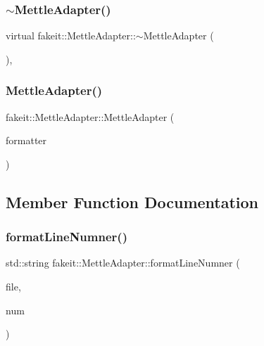 \subsubsection{\texorpdfstring{$\sim$MettleAdapter()}{~MettleAdapter()}\hspace{0.1cm}{\footnotesize\ttfamily [2/2]}}
{\footnotesize\ttfamily virtual fakeit\+::\+Mettle\+Adapter\+::$\sim$\+Mettle\+Adapter (\begin{DoxyParamCaption}{ }\end{DoxyParamCaption})\hspace{0.3cm}{\ttfamily [virtual]}, {\ttfamily [default]}}

\mbox{\label{structfakeit_1_1MettleAdapter_a0d89a32cd8b88da3f8abacc54c0414a2}} 
\subsubsection{\texorpdfstring{MettleAdapter()}{MettleAdapter()}\hspace{0.1cm}{\footnotesize\ttfamily [2/2]}}
{\footnotesize\ttfamily fakeit\+::\+Mettle\+Adapter\+::\+Mettle\+Adapter (\begin{DoxyParamCaption}\item[{\mbox{\hyperlink{structfakeit_1_1EventFormatter}{Event\+Formatter}} \&}]{formatter }\end{DoxyParamCaption})\hspace{0.3cm}{\ttfamily [inline]}}



\subsection{Member Function Documentation}
\mbox{\label{structfakeit_1_1MettleAdapter_abd44747bce7bbc8aaa94fe8a742bf5c6}} 
\subsubsection{\texorpdfstring{formatLineNumner()}{formatLineNumner()}\hspace{0.1cm}{\footnotesize\ttfamily [1/2]}}
{\footnotesize\ttfamily std\+::string fakeit\+::\+Mettle\+Adapter\+::format\+Line\+Numner (\begin{DoxyParamCaption}\item[{std\+::string}]{file,  }\item[{int}]{num }\end{DoxyParamCaption})\hspace{0.3cm}{\ttfamily [inline]}}

